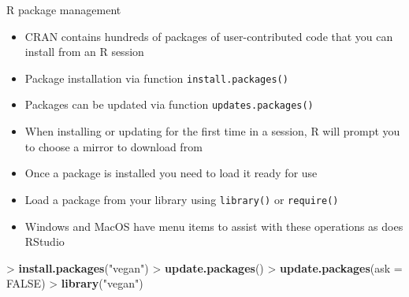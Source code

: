 \documentclass[10pt,ignorenonframetext,compress, aspectratio=169]{beamer}
\newenvironment{Shaded}{\begin{snugshade}}{\end{snugshade}}
\newcommand{\KeywordTok}[1]{\textcolor[rgb]{0.13,0.29,0.53}{\textbf{{#1}}}}
\newcommand{\DataTypeTok}[1]{\textcolor[rgb]{0.13,0.29,0.53}{{#1}}}
\newcommand{\StringTok}[1]{\textcolor[rgb]{0.31,0.60,0.02}{{#1}}}
\newcommand{\OtherTok}[1]{\textcolor[rgb]{0.56,0.35,0.01}{{#1}}}
\newcommand{\NormalTok}[1]{{#1}}
\providecommand{\tightlist}{%
  \setlength{\itemsep}{0pt}\setlength{\parskip}{0pt}}
\begin{document}
\begin{frame}[fragile]{R package management}

\begin{itemize}
\tightlist
\item
  CRAN contains hundreds of packages of user-contributed code that you
  can install from an R session
\item
  Package installation via function \texttt{install.packages()}
\item
  Packages can be updated via function \texttt{updates.packages()}
\item
  When installing or updating for the first time in a session, R will
  prompt you to choose a mirror to download from
\item
  Once a package is installed you need to load it ready for use
\item
  Load a package from your library using \texttt{library()} or
  \texttt{require()}
\item
  Windows and MacOS have menu items to assist with these operations as
  does RStudio
\end{itemize}

\begin{Shaded}
\begin{Highlighting}[]
\NormalTok{>}\StringTok{ }\KeywordTok{install.packages}\NormalTok{(}\StringTok{"vegan"}\NormalTok{)}
\NormalTok{>}\StringTok{ }\KeywordTok{update.packages}\NormalTok{()}
\NormalTok{>}\StringTok{ }\KeywordTok{update.packages}\NormalTok{(}\DataTypeTok{ask =} \OtherTok{FALSE}\NormalTok{)}
\NormalTok{>}\StringTok{ }\KeywordTok{library}\NormalTok{(}\StringTok{"vegan"}\NormalTok{)}
\end{Highlighting}
\end{Shaded}

\end{frame}
\end{document}
